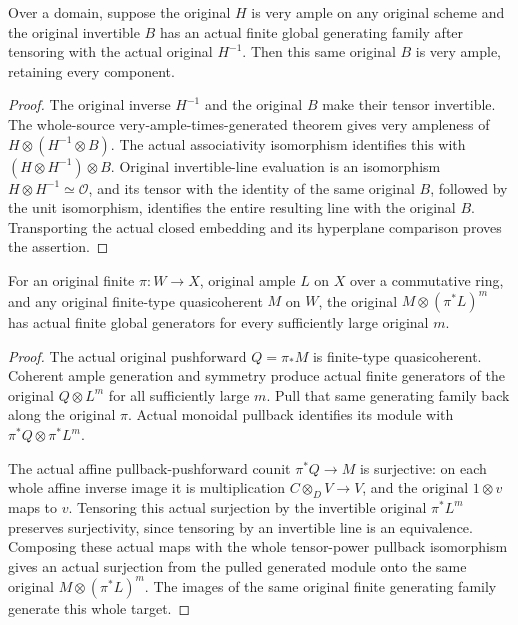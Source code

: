 \begin{lemma}
\label{lem:kn-nadel-very-ample-inverse-generated}
\leanok
{}
Over a domain, suppose the original $H$ is very ample on any original
scheme and the original invertible $B$ has an actual finite global
generating family after tensoring with the actual original $H^{-1}$.
Then this same original $B$ is very ample, retaining every component.
\end{lemma}
\begin{proof}
The original inverse $H^{-1}$ and the original $B$ make their tensor
invertible. The whole-source very-ample-times-generated theorem gives
very ampleness of $H\otimes(H^{-1}\otimes B)$. The actual associativity
isomorphism identifies this with $(H\otimes H^{-1})\otimes B$.
Original invertible-line evaluation is an isomorphism
$H\otimes H^{-1}\simeq\mathcal O$, and its tensor with the identity
of the same original $B$, followed by the unit isomorphism, identifies
the entire resulting line with the original $B$. Transporting the actual
closed embedding and its hyperplane comparison proves the assertion.
\end{proof}

\begin{lemma}
\label{lem:kn-nadel-finite-pullback-coherent-generation}
\leanok
{}
For an original finite $\pi:W\to X$, original ample $L$ on $X$ over a
commutative ring, and any original finite-type quasicoherent $M$ on $W$,
the original $M\otimes(\pi^*L)^m$ has actual finite global generators for
every sufficiently large original $m$.
\end{lemma}
\begin{proof}
The actual original pushforward $Q=\pi_*M$ is finite-type quasicoherent.
Coherent ample generation and symmetry produce actual finite generators
of the original $Q\otimes L^m$ for all sufficiently large $m$. Pull that
same generating family back along the original $\pi$. Actual monoidal
pullback identifies its module with $\pi^*Q\otimes\pi^*L^m$.

The actual affine pullback-pushforward counit $\pi^*Q\to M$ is surjective:
on each whole affine inverse image it is multiplication
$C\otimes_D V\to V$, and the original $1\otimes v$ maps to $v$.
Tensoring this actual surjection by the invertible original $\pi^*L^m$
preserves surjectivity, since tensoring by an invertible line is an
equivalence. Composing these actual maps with the whole tensor-power
pullback isomorphism gives an actual surjection from the pulled generated
module onto the same original $M\otimes(\pi^*L)^m$. The images of the
same original finite generating family generate this whole target.
\end{proof}

